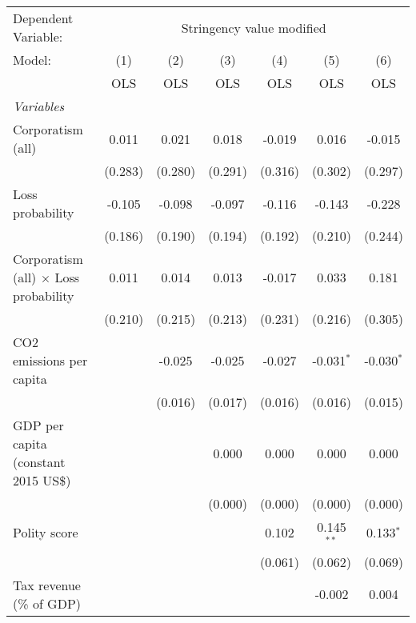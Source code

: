 
\begingroup
\centering
\begin{tabular}{lcccccc}
   \toprule
   Dependent Variable: & \multicolumn{6}{c}{Stringency value modified}\\
   Model:                                       & (1)     & (2)     & (3)     & (4)     & (5)          & (6)\\  
                                                &  OLS    & OLS     & OLS     & OLS     & OLS          & OLS\\  
   \midrule
   \emph{Variables}\\
   Corporatism (all)                            & 0.011   & 0.021   & 0.018   & -0.019  & 0.016        & -0.015\\   
                                                & (0.283) & (0.280) & (0.291) & (0.316) & (0.302)      & (0.297)\\   
   Loss probability                             & -0.105  & -0.098  & -0.097  & -0.116  & -0.143       & -0.228\\   
                                                & (0.186) & (0.190) & (0.194) & (0.192) & (0.210)      & (0.244)\\   
   Corporatism (all) $\times$ Loss probability  & 0.011   & 0.014   & 0.013   & -0.017  & 0.033        & 0.181\\   
                                                & (0.210) & (0.215) & (0.213) & (0.231) & (0.216)      & (0.305)\\   
   CO2 emissions per capita                     &         & -0.025  & -0.025  & -0.027  & -0.031$^{*}$ & -0.030$^{*}$\\   
                                                &         & (0.016) & (0.017) & (0.016) & (0.016)      & (0.015)\\   
   GDP per capita (constant 2015 US\$)          &         &         & 0.000   & 0.000   & 0.000        & 0.000\\   
                                                &         &         & (0.000) & (0.000) & (0.000)      & (0.000)\\   
   Polity score                                 &         &         &         & 0.102   & 0.145$^{**}$ & 0.133$^{*}$\\   
                                                &         &         &         & (0.061) & (0.062)      & (0.069)\\   
   Tax revenue (\% of GDP)                      &         &         &         &         & -0.002       & 0.004\\   

\end{tabular}
